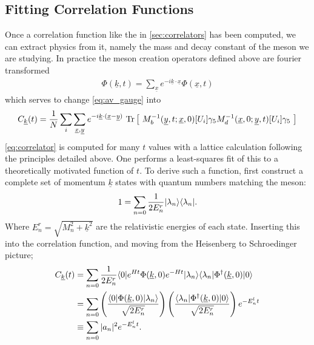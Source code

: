 \subsection{Fitting Correlation Functions}
\label{sec:fitting}

Once a correlation function like the in \ref{sec:correlators} has been computed, we can extract physics from it, namely the mass and decay constant of the meson we are studying. In practice the meson creation operators defined above are fourier transformed
\begin{align}
	\Phi(\underline{k},t) = \sum_{\underline{x}} e^{-i\underline{k}\cdot\underline{x}} \Phi(\underline{x},t)
\end{align}
which serves to change \eqref{eq:av_gauge} into 
\begin{align}
	C_{\underline{k}}(t) = {1\over N} \sum_i \sum_{\underline{x},\underline{y}} e^{-i\underline{k}\cdot(\underline{x}-\underline{y})} \text{ Tr}\left[\text{ } M^{-1}_b(\underline{y},t;\underline{x},0)[U_i] \gamma_5 M^{-1}_d(\underline{x},0;\underline{y},t)[U_i] \gamma_5 \text{ }\right]
	\label{eq:correlator}
\end{align}
\eqref{eq:correlator} is computed for many $t$ values with a lattice calculation following the principles detailed above. One performs a least-squares fit of 
this to a theoretically motivated function of $t$. To derive such a function,
first construct a complete set of momentum $\underline{k}$ states with quantum numbers matching the meson:
\begin{align}
 1 = \sum_{n=0} {1\over 2E^r_n} | \lambda_n \rangle \langle \lambda_n |.
\end{align}
Where $E^r_n = \sqrt{ M_n^2 + \underline{k}^2}$ are the relativistic energies of each state. Inserting this into the correlation function, and moving from the Heisenberg to Schroedinger picture;
\begin{align}
	C_{\underline{k}}(t) &= \sum_{n=0} {1\over 2E^r_n} \langle 0 | e^{Ht} \Phi(\underline{k},0) e^{-Ht} | \lambda_n \rangle \langle \lambda_n | \Phi^{\dagger}(\underline{k},0) | 0 \rangle
	\nonumber
	\\ &= \sum_{n=0}  \left( {\langle 0 | \Phi(\underline{k},0) | \lambda_n \rangle \over \sqrt{2E^r_n}} \right) \left( {\langle \lambda_n | \Phi^{\dagger}(\underline{k},0) | 0 \rangle \over \sqrt{2E^r_n} } \right) e^{-E^l_n t}
	\nonumber
	\\ & \equiv \sum_{n=0} |a_n|^2 e^{-E^l_n t}.
	\label{eq:multiexponential}
\end{align}
